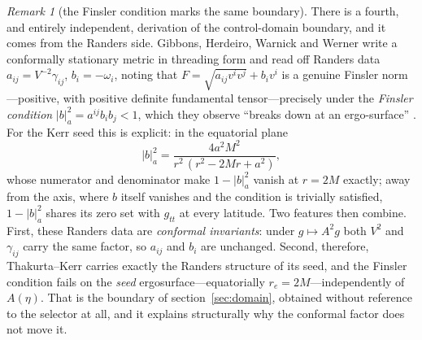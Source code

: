 \documentclass[12pt]{iopart}
\theoremstyle{plain}
\theoremstyle{definition}
\theoremstyle{remark}
\newtheorem{remark}[proposition]{Remark}
\begin{document}
\begin{remark}[the Finsler condition marks the same boundary]
\label{rmk:finsler-domain}
There is a fourth, and entirely independent, derivation of the control-domain
boundary, and it comes from the Randers side. Gibbons, Herdeiro, Warnick and Werner
write a conformally stationary metric in threading form and read off Randers data
$a_{ij}=V^{-2}\gamma_{ij}$, $b_i=-\omega_i$, noting that
$F=\sqrt{a_{ij}v^iv^j}+b_iv^i$ is a genuine Finsler norm---positive, with positive
definite fundamental tensor---precisely under the \emph{Finsler condition}
$|b|^2_a=a^{ij}b_ib_j<1$, which they observe ``breaks down at an ergo-surface''
\cite[\S2.1, \S3.4]{GibbonsRanders2009}. For the Kerr seed this is explicit: in the
equatorial plane
\begin{equation}
    |b|^2_a=\frac{4a^2M^2}{r^2\,(r^2-2Mr+a^2)} ,
    \label{eq:finsler-condition}
\end{equation}
whose numerator and denominator make $1-|b|^2_a$ vanish at $r=2M$ exactly; away from
the axis, where $b$ itself vanishes and the condition is trivially satisfied,
$1-|b|^2_a$ shares its zero set with $g_{tt}$ at every latitude. Two features then
combine. First, these Randers data are \emph{conformal invariants}: under
$g\mapsto A^2g$ both $V^2$ and $\gamma_{ij}$ carry the same factor, so $a_{ij}$ and
$b_i$ are unchanged. Second, therefore, Thakurta--Kerr carries exactly the Randers
structure of its seed, and the Finsler condition fails on the \emph{seed}
ergosurface---equatorially $r_e=2M$---independently of $A(\eta)$. That is the
boundary of section~\ref{sec:domain}, obtained without reference to the selector at
all, and it explains structurally why the conformal factor does not move it.


\end{remark}
\end{document}
